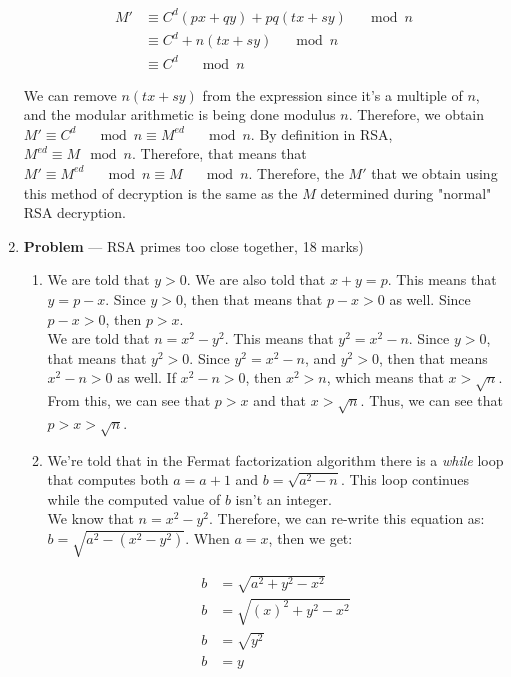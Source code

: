 \documentclass[11pt]{article}
\theoremstyle{definition}
\newcounter{problem}
\begin{document}
\begin{enumerate}
\begin{align*}
    M' &\equiv C^d(px + qy) + pq(tx + sy) \quad \mod{n} \\
    &\equiv C^d + n(tx + sy) \quad \mod{n} \\
    &\equiv C^d \quad \mod{n}
\end{align*}

We can remove $n(tx + sy)$ from the expression since it's a multiple of $n$, and the modular arithmetic is being done modulus $n$. Therefore, we obtain $M' \equiv C^d \quad \mod{n} \equiv M^{ed} \quad \mod{n}$. By definition in RSA, $M^{ed} \equiv M \mod{n}$. Therefore, that means that $M' \equiv M^{ed} \quad \mod{n} \equiv M \quad \mod{n}$. Therefore, the $M'$ that we obtain using this method of decryption is the same as the $M$ determined during "normal" RSA decryption.

\newpage

\item[] \textbf{Problem \theproblem} ---  RSA primes too close together, 18 marks)


\begin{enumerate}
\item %
We are told that $y > 0$. We are also told that $x + y = p$. This means that $y = p - x$. Since $y > 0$, then that means that $p - x > 0$ as well. Since $p - x > 0$, then $p > x$. \\

We are told that $n = x^2 - y^2$. This means that $y^2 = x^2 - n$. Since $y > 0$, that means that $y^2 > 0$. Since $y^2 = x^2 - n$, and $y^2 > 0$, then that means $x^2 - n > 0$ as well. If $x^2 - n > 0$, then $x^2 > n$, which means that $x > \sqrt{n}$. \\

From this, we can see that $p > x$ and that $x > \sqrt{n}$. Thus, we can see that $p > x > \sqrt{n}$.


\item  %
We're told that in the Fermat factorization algorithm there is a \textit{while} loop that computes both $a = a + 1$ and $b = \sqrt{a^2 - n}$. This loop continues while the computed value of $b$ isn't an integer. \\

We know that $n = x^2 - y^2$. Therefore, we can re-write this equation as: $b = \sqrt{a^2 - (x^2 - y^2)}$. When $a = x$, then we get:

\begin{align*}
    b &= \sqrt{a^2 + y^2 - x^2} \\
    b &= \sqrt{(x)^2 + y^2 - x^2} \\
    b &= \sqrt{y^2} \\
    b &= y
\end{align*}


\end{enumerate}
\end{enumerate}
\end{document}
